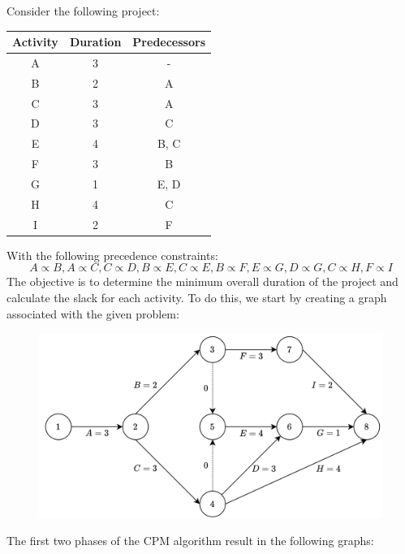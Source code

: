 \begin{example}
    Consider the following project:
    \begin{table}[H]
        \centering
        \begin{tabular}{ccc}
        \hline
        \textbf{Activity} & \textbf{Duration} & \textbf{Predecessors} \\ \hline
        A                 & 3                 & -                     \\
        B                 & 2                 & A                     \\
        C                 & 3                 & A                     \\
        D                 & 3                 & C                     \\
        E                 & 4                 & B, C                  \\
        F                 & 3                 & B                     \\
        G                 & 1                 & E, D                  \\
        H                 & 4                 & C                     \\
        I                 & 2                 & F                     \\ \hline
        \end{tabular}
    \end{table}
    With the following precedence constraints:
    \[A \varpropto B,A \varpropto C,C \varpropto D,B \varpropto E, C \varpropto E,B \varpropto F,E \varpropto G,D \varpropto G,C \varpropto H,F \varpropto I\]
    The objective is to determine the minimum overall duration of the project and calculate the slack for each activity. 
    To do this, we start by creating a graph associated with the given problem:
    \begin{figure}[H]
        \centering
        \includegraphics[width=0.5\linewidth]{images/eproject.png}
    \end{figure}
    The first two phases of the CPM algorithm result in the following graphs:
    \begin{figure}[H]

\end{figure}
\end{example}
